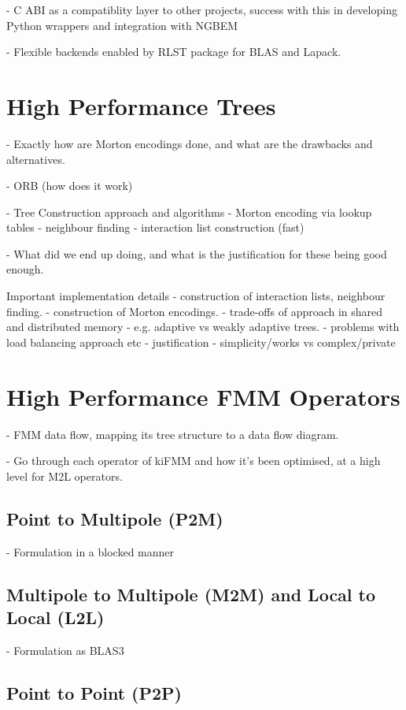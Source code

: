 - C ABI as a compatiblity layer to other projects, success with this in developing Python wrappers and integration with NGBEM

- Flexible backends enabled by RLST package for BLAS and Lapack.


\section{High Performance Trees}

- Exactly how are Morton encodings done, and what are the drawbacks and alternatives.

- ORB (how does it work)

- Tree Construction approach and algorithms
    - Morton encoding via lookup tables
    - neighbour finding
    - interaction list construction (fast)

- What did we end up doing, and what is the justification for these being good enough.


Important implementation details
    - construction of interaction lists, neighbour finding.
    - construction of Morton encodings.
    - trade-offs of approach in shared and distributed memory
        - e.g. adaptive vs weakly adaptive trees.
        - problems with load balancing approach etc
    - justification
        - simplicity/works vs complex/private


\section{High Performance FMM Operators}

- FMM data flow, mapping its tree structure to a data flow diagram.

- Go through each operator of kiFMM and how it's been optimised, at a high level for M2L operators.

\subsection{Point to Multipole (P2M)}

- Formulation in a blocked manner
\subsection{Multipole to Multipole (M2M) and Local to Local (L2L)}

- Formulation as BLAS3

\subsection{Point to Point (P2P)}

